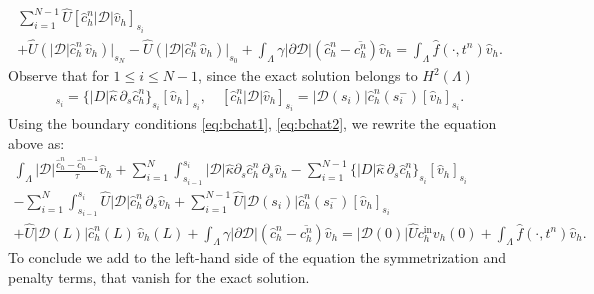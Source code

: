 \documentclass[pdflatex,sn-mathphys-num]{sn-jnl}%
\theoremstyle{thmstyleone}%
\theoremstyle{thmstyletwo}%
\theoremstyle{thmstylethree}%
\begin{document}
\begin{appendices}
\begin{align*}
\sum_{i=1}^{N-1} \hat{U} [ \hat c_h^n |\mathcal{D}|\hat{v}_h]_{s_{i}} \\
+ \hat U (|\mathcal{D}|\hat c_h^n\, \hat{v}_h)\Big|_{s_N}
- \hat U (|\mathcal{D}|\hat c_h^n\, \hat{v}_h)\Big|_{s_0}
+ \int_{\Lambda} \gamma \vert \partial \mathcal{D}\vert (\hat c_h^n - \overline{c_h^n}) \hat v_h
= \int_\Lambda \hat f(\cdot,t^n) \hat v_h.
\end{align*}
Observe that for $1 \leq i \leq N-1$, since the exact solution belongs to $H^2(\Lambda)$
\begin{align}
       [|D| \hat \kappa \partial_s \hat c_h^n \, \hat v_h]_{s_i} = \{ |D|\hat\kappa \, \partial_s \hat c_h^n \}_{s_i} [\hat v_h]_{s_i}, 
       \quad
 [ \hat c_h^n |\mathcal{D}|\hat{v}_h]_{s_{i}}
 = \vert \mathcal{D}(s_i)\vert \hat c_h^n(s_i^-) [ \hat v_h]_{s_i}.
\end{align}
Using the boundary conditions \eqref{eq:bchat1}, \eqref{eq:bchat2}, we rewrite the equation above as:
\begin{align*}
\int_\Lambda |\mathcal{D}|\frac{\hat c_h^n-\hat c_h^{n-1}}{\tau}\hat{v}_h
+\sum_{i=1}^{N} \int_{s_{i-1}}^{s_i} 
|\mathcal{D}|\hat \kappa \partial_s \hat c_h^n\, \partial_s \hat v_h
-  \sum_{i=1}^{N-1} \{ |D|\hat\kappa \, \partial_s \hat c_h^n \}_{s_i} [\hat v_h]_{s_i}\\
     -\sum_{i=1}^{N}\int_{s_{i-1}}^{s_i} \hat{U} |\mathcal{D}| \hat{c}_h^n \, \partial_s \hat v_h +
     \sum_{i=1}^{N-1} \hat{U}  
     \vert \mathcal{D}(s_i)\vert \hat c_h^n(s_i^-) [ \hat v_h]_{s_i} \\
     + \hat U |\mathcal{D}(L)|\hat c_h^n(L) \, \hat{v}_h(L) 
+ \int_{\Lambda} \gamma \vert \partial \mathcal{D}\vert (\hat c_h^n - \overline{c_h^n}) \hat v_h
= \vert \mathcal{D}(0)\vert \hat U c_h^\mathrm{in} v_h(0) + \int_\Lambda \hat f(\cdot,t^n) \hat v_h.
\end{align*}
To conclude we add to the left-hand side of the equation the symmetrization and penalty terms, that vanish for the exact solution.



\end{appendices}
\end{document}
